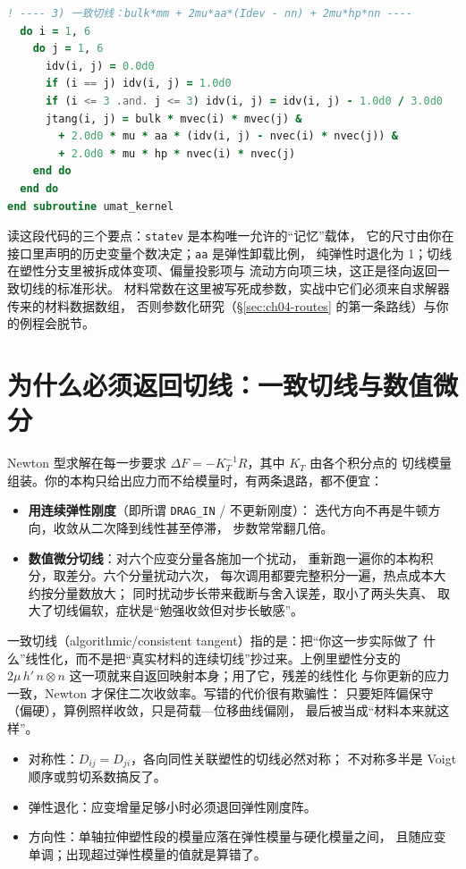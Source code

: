\documentclass[12pt,a4paper,fontset=fandol]{ctexbook}
\newcommand{\Tp}[1]{\texttt{#1}}
\newcommand{\Lang}[1]{\textsf{#1}}
\begin{document}
\begin{lstlisting}[language=Fortran, style=fortranstyle, caption={用户材料内核骨架：J2 径向返回 + 一致切线（\Lang{Fortran} 自由格式）}, label={lst:ch04-umat-kernel}]
  ! ---- 3) 一致切线：bulk*mm + 2mu*aa*(Idev - nn) + 2mu*hp*nn ----
  do i = 1, 6
    do j = 1, 6
      idv(i, j) = 0.0d0
      if (i == j) idv(i, j) = 1.0d0
      if (i <= 3 .and. j <= 3) idv(i, j) = idv(i, j) - 1.0d0 / 3.0d0
      jtang(i, j) = bulk * mvec(i) * mvec(j) &
        + 2.0d0 * mu * aa * (idv(i, j) - nvec(i) * nvec(j)) &
        + 2.0d0 * mu * hp * nvec(i) * nvec(j)
    end do
  end do
end subroutine umat_kernel
\end{lstlisting}

读这段代码的三个要点：\Tp{statev} 是本构唯一允许的``记忆''载体，
它的尺寸由你在接口里声明的历史变量个数决定；\Tp{aa} 是弹性卸载比例，
纯弹性时退化为 1；切线在塑性分支里被拆成体变项、偏量投影项与
流动方向项三块，这正是径向返回一致切线的标准形状。
材料常数在这里被写死成参数，实战中它们必须来自求解器传来的材料数据数组，
否则参数化研究（\S\ref{sec:ch04-routes} 的第一条路线）与你的例程会脱节。

\section{为什么必须返回切线：一致切线与数值微分}
\label{sec:ch04-tangent}

Newton 型求解在每一步要求 $\Delta F = -K_T^{-1} R$，其中 $K_T$ 由各个积分点的
切线模量组装。你的本构只给出应力而不给模量时，有两条退路，都不便宜：

\begin{itemize}
  \item \textbf{用连续弹性刚度}（即所谓 \Tp{DRAG\_IN} / 不更新刚度）：
        迭代方向不再是牛顿方向，收敛从二次降到线性甚至停滞，
        步数常常翻几倍。
  \item \textbf{数值微分切线}：对六个应变分量各施加一个扰动，
        重新跑一遍你的本构积分，取差分。六个分量扰动六次，
        每次调用都要完整积分一遍，热点成本大约按分量数放大；
        同时扰动步长带来截断与舍入误差，取小了两头失真、
        取大了切线偏软，症状是``勉强收敛但对步长敏感''。
\end{itemize}

一致切线（algorithmic/consistent tangent）指的是：把``你这一步实际做了
什么''线性化，而不是把``真实材料的连续切线''抄过来。上例里塑性分支的
$2\mu\,h'\,n\otimes n$ 这一项就来自返回映射本身；用了它，残差的线性化
与你更新的应力一致，Newton 才保住二次收敛率。写错的代价很有欺骗性：
只要矩阵偏保守（偏硬），算例照样收敛，只是荷载—位移曲线偏刚，
最后被当成``材料本来就这样''。

\begin{note}[title={切线自检的三条硬指标}]
\begin{itemize}
  \item 对称性：$D_{ij} = D_{ji}$，各向同性关联塑性的切线必然对称；
        不对称多半是 Voigt 顺序或剪切系数搞反了。
  \item 弹性退化：应变增量足够小时必须退回弹性刚度阵。
  \item 方向性：单轴拉伸塑性段的模量应落在弹性模量与硬化模量之间，
        且随应变单调；出现超过弹性模量的值就是算错了。
\end{itemize}
\end{note}
\end{document}
